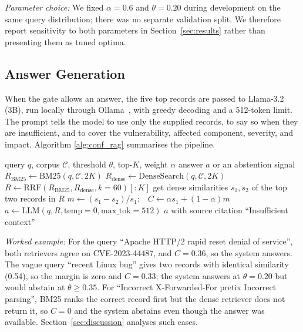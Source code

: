 \documentclass[conference]{IEEEtran}
\begin{document}
\noindent\textit{Parameter choice:} We fixed $\alpha=0.6$ and
$\theta=0.20$ during development on the same query distribution; there
was no separate validation split. We therefore report sensitivity to both
parameters in Section~\ref{sec:results} rather than presenting them as
tuned optima.

\subsection{Answer Generation}
When the gate allows an answer, the five top records are passed to
Llama-3.2 (3B), run locally through Ollama~\cite{ref_llama}, with greedy
decoding and a 512-token limit. The prompt tells the model to use only the
supplied records, to say so when they are insufficient, and to cover the
vulnerability, affected component, severity, and impact. Algorithm
\ref{alg:conf_rag} summarises the pipeline.

\begin{algorithm}[t]
\caption{Confidence-Aware RAG with Abstention}
\label{alg:conf_rag}
\small
\begin{algorithmic}[1]
\REQUIRE query $q$, corpus $\mathcal{C}$, threshold $\theta$, top-$K$,
weight $\alpha$
\ENSURE answer $a$ or an abstention signal
\STATE $R_{\mathrm{BM25}}\leftarrow\text{BM25}(q,\mathcal{C},2K)$
\STATE $R_{\mathrm{dense}}\leftarrow\text{DenseSearch}(q,\mathcal{C},2K)$
\STATE $R\leftarrow\text{RRF}(R_{\mathrm{BM25}},R_{\mathrm{dense}},k{=}60)[{:}K]$
\STATE get dense similarities $s_1,s_2$ of the top two records in $R$
\STATE $m\leftarrow(s_1-s_2)/s_1$;\ \ $C\leftarrow\alpha s_1+(1-\alpha)m$
    \STATE $a\leftarrow\text{LLM}(q,R,\text{temp}{=}0,\text{max\_tok}{=}512)$
    \RETURN $a$ with source citation
\ELSE
    \RETURN ``Insufficient context''
\ENDIF
\end{algorithmic}
\end{algorithm}

\noindent\textit{Worked example:} For the query ``Apache HTTP/2 rapid
reset denial of service'', both retrievers agree on CVE-2023-44487, and
$C=0.36$, so the system answers. The vague query ``recent Linux bug''
gives two records with identical similarity (0.54), so the margin is zero
and $C=0.33$; the system answers at $\theta=0.20$ but would abstain at
$\theta\ge0.35$. For ``Incorrect X-Forwarded-For pretix Incorrect
parsing'', BM25 ranks the correct record first but the dense retriever
does not return it, so $C=0$ and the system abstains even though the
answer was available. Section~\ref{sec:discussion} analyses such cases.
\end{document}
